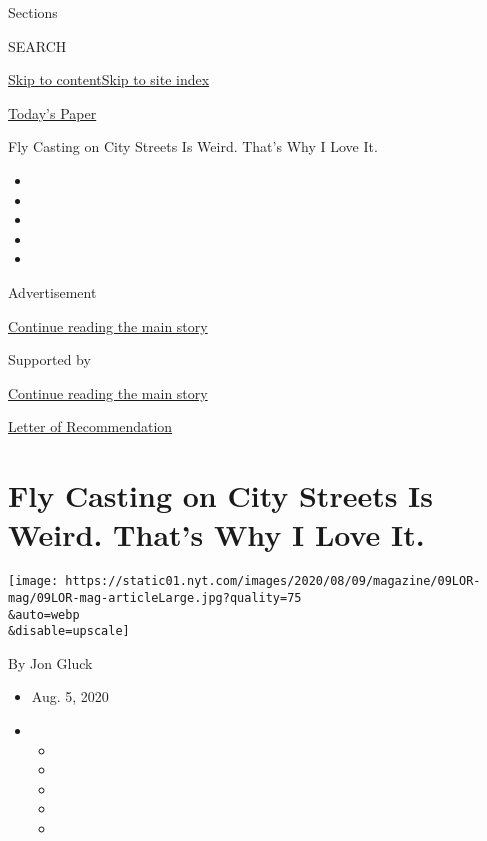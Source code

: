 Sections

SEARCH

\protect\hyperlink{site-content}{Skip to
content}\protect\hyperlink{site-index}{Skip to site index}

\href{https://myaccount.nytimes.com/auth/login?response_type=cookie\&client_id=vi}{}

\href{https://www.nytimes.com/section/todayspaper}{Today's Paper}

Fly Casting on City Streets Is Weird. That's Why I Love It.

\begin{itemize}
\item
\item
\item
\item
\item
\end{itemize}

Advertisement

\protect\hyperlink{after-top}{Continue reading the main story}

Supported by

\protect\hyperlink{after-sponsor}{Continue reading the main story}

\href{/column/letter-of-recommendation}{Letter of Recommendation}

\hypertarget{fly-casting-on-city-streets-is-weird-thats-why-i-love-it}{%
\section{Fly Casting on City Streets Is Weird. That's Why I Love
It.}\label{fly-casting-on-city-streets-is-weird-thats-why-i-love-it}}

\texttt{[image: https://static01.nyt.com/images/2020/08/09/magazine/09LOR-mag/09LOR-mag-articleLarge.jpg?quality=75\\\&auto=webp\\\&disable=upscale]}

By Jon Gluck

\begin{itemize}
\item
  Aug. 5, 2020
\item
  \begin{itemize}
  \item
  \item
  \item
  \item
  \item
  \end{itemize}
\end{itemize}

